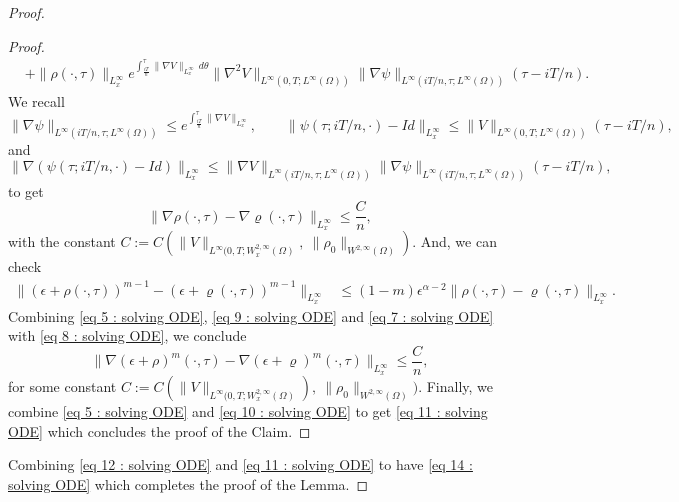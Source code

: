 \documentclass{amsart}
\numberwithin{equation}{section}
\begin{document}
\begin{proof}
\begin{proof}
\begin{equation*}
\begin{aligned}
&+\|\rho(\cdot,\tau)\|_{L^{\infty}_{x}} e^{\int_{\frac{iT}{n}}^\tau \|\nabla V\|_{L^{\infty}_{x}} \,d\theta}\|\nabla^2 V\|_{L^\infty(0,T; L^\infty(\Omega))} \|\nabla \psi\|_{L^\infty(iT/n, \tau; L^\infty(\Omega))}(\tau-iT/n).
\end{aligned}
\end{equation*}
We recall
$$\|\nabla \psi\|_{L^\infty(iT/n, \tau ; L^\infty(\Omega))} \leq e^{\int_{\frac{iT}{n}}^\tau \|\nabla V\|_{L^{\infty}_{x}}}, \qquad  \|\psi(\tau; iT/n,\cdot) -Id\|_{L^{\infty}_{x}} \leq \| V\|_{L^\infty(0,T;L^\infty(\Omega))}(\tau-iT/n) ,$$
and
$$\|\nabla(\psi(\tau; iT/n, \cdot)-Id)\|_{L^{\infty}_{x}} \leq \|\nabla V\|_{L^\infty(iT/n, \tau ; L^\infty(\Omega))} \|\nabla \psi\|_{L^\infty(iT/n, \tau ; L^\infty(\Omega))}(\tau-iT/n),$$
to get 
\begin{equation}\label{eq 9 : solving ODE}
\|\nabla \rho(\cdot,\tau) -\nabla\varrho(\cdot,\tau)\|_{L^{\infty}_{x}} \leq \frac{C}{n}, 
\end{equation}
with the constant $C:=C(\|V\|_{L^\infty(0,T ;W_x^{2, \infty}(\Omega)},~ \|\rho_0\|_{W^{2, \infty}(\Omega)})$. 
And, we can check
\begin{equation}\label{eq 7 : solving ODE}
\begin{aligned}
\|(\epsilon +\rho(\cdot,\tau))^{m-1} -(\epsilon +\varrho(\cdot,\tau))^{m-1}\|_{L^{\infty}_{x}} &\leq (1-m)\epsilon^{\alpha-2}\|\rho(\cdot,\tau)-\varrho(\cdot,\tau)\|_{L^{\infty}_{x}}.
\end{aligned}
\end{equation}
Combining \eqref{eq 5 : solving ODE}, \eqref{eq 9 : solving ODE} and \eqref{eq 7 : solving ODE} with \eqref{eq 8 : solving ODE}, we conclude
\begin{equation}\label{eq 10 : solving ODE}
\| \nabla (\epsilon+\rho)^m(\cdot,\tau)-\nabla  (\epsilon+\varrho)^m(\cdot,\tau)\|_{L^{\infty}_{x}} \leq \frac{C}{n},
\end{equation}
for some constant $C:=C(\|V\|_{L^\infty(0,T ;W_x^{2, \infty}(\Omega)}),~ \|\rho_0\|_{W^{2, \infty}(\Omega)})$. Finally, we combine \eqref{eq 5 : solving ODE} and \eqref{eq 10 : solving ODE} to get \eqref{eq 11 : solving ODE} which concludes the proof of the Claim.
\end{proof}
Combining \eqref{eq 12 : solving ODE} and \eqref{eq 11 : solving ODE} to have \eqref{eq 14 : solving ODE} which completes the proof of the Lemma.
\end{proof}
\end{document}
